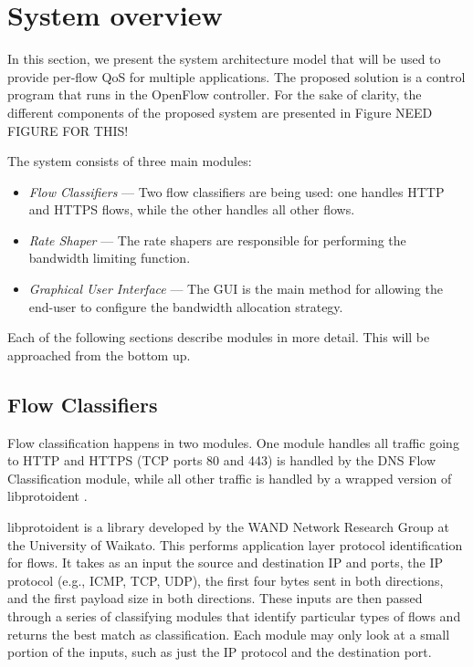 \section{System overview}
In this section, we present the system architecture model that will be used to provide per-flow QoS for multiple applications. The proposed solution is a control program that runs in the OpenFlow controller. For the sake of clarity, the different components of the proposed system are presented in Figure NEED FIGURE FOR THIS! %

The system consists of three main modules: 

\begin{itemize} 
  \item \emph{Flow Classifiers} --- Two flow classifiers are being used: one handles HTTP and HTTPS flows, while the other handles all other flows.
  \item \emph{Rate Shaper} --- The rate shapers are responsible for performing the bandwidth limiting function.
  \item \emph{Graphical User Interface} --- The GUI is the main method for allowing the end-user to configure the bandwidth allocation strategy.   
\end{itemize}

Each of the following sections describe modules in more detail. This will be approached from the bottom up.

\subsection{Flow Classifiers}
Flow classification happens in two modules. One module handles all traffic going to HTTP and HTTPS (TCP ports 80 and 443) is handled by the DNS Flow Classification module, while all other traffic is handled by a wrapped version of libprotoident \cite{AlcockLibprotoident2012}. 

libprotoident is a library developed by the WAND Network Research Group at the University of Waikato. This performs application layer protocol identification for flows. It takes as an input the source and destination IP and ports, the IP protocol (e.g., ICMP, TCP, UDP), the first four bytes sent in both directions, and the first payload size in both directions. These inputs are then passed through a series of classifying modules that identify particular types of flows and returns the best match as classification. Each module may only look at a small portion of the inputs, such as just the IP protocol and the destination port.

